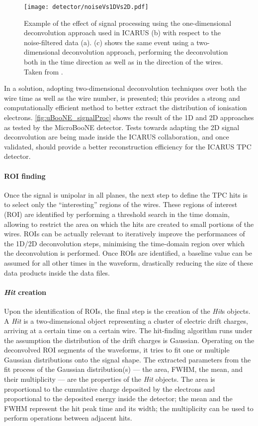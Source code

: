 \begin{figure}
    \centering
    \texttt{[image: detector/noiseVs1DVs2D.pdf]}
    \caption[TPC signal processing]{Example of the effect of signal processing using the one-dimensional deconvolution approach used in ICARUS (b) with respect to the noise-filtered data (a). (c) shows the same event using a two-dimensional deconvolution approach, performing the deconvolution both in the time direction as well as in the direction of the wires. Taken from \cite{MicroBooNE:2018swd}. }
    \label{fig:uBooNE_signalProc}
\end{figure}

In \cite{MicroBooNE:2018swd,MicroBooNE:2018vro} a solution, adopting two-dimensional deconvolution techniques over both the wire time as well as the wire number, is presented; this provides a strong and computationally efficient method to better extract the distribution of ionisation electrons. \autoref{fig:uBooNE_signalProc} shows the result of the 1D and 2D approaches as tested by the MicroBooNE detector. Tests towards adapting the 2D signal deconvolution are being made inside the ICARUS collaboration, and once validated, should provide a better reconstruction efficiency for the ICARUS TPC detector. 

\paragraph{ROI finding} Once the signal is unipolar in all planes, the next step to define the TPC hits is to select only the ``interesting'' regions of the wires. These regions of interest (ROI) are identified by performing a threshold search in the time domain, allowing to restrict the area on which the hits are created to small portions of the wires. ROIs can be actually relevant to iteratively improve the performances of the 1D/2D deconvolution steps, minimising the time-domain region over which the deconvolution is performed. Once ROIs are identified, a baseline value can be assumed for all other times in the waveform, drastically reducing the size of these data products inside the data files. 

\paragraph{\emph{Hit} creation} Upon the identification of ROIs, the final step is the creation of the \emph{Hit}s objects. A \emph{Hit} is a two-dimensional object representing a cluster of electric drift charges, arriving at a certain time on a certain wire. The hit-finding algorithm runs under the assumption the distribution of the drift charges is Gaussian. Operating on the deconvolved ROI segments of the waveforms, it tries to fit one or multiple Gaussian distributions onto the signal shape. The extracted parameters from the fit process of the Gaussian distribution(s) --- the area, FWHM, the mean, and their multiplicity --- are the properties of the \emph{Hit} objects. The area is proportional to the cumulative charge deposited by the electrons and proportional to the deposited energy inside the detector; the mean and the FWHM represent the hit peak time and its width; the multiplicity can be used to perform operations between adjacent hits. 

